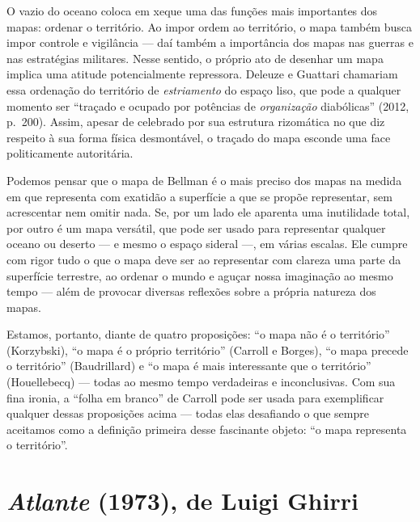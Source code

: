 O vazio do oceano coloca em xeque uma das funções mais importantes dos
mapas: ordenar o território. Ao impor ordem ao território, o mapa também
busca impor controle e vigilância --- daí também a importância dos mapas
nas guerras e nas estratégias militares. Nesse sentido, o próprio ato de
desenhar um mapa implica uma atitude potencialmente repressora. Deleuze
e Guattari chamariam essa ordenação do território de \emph{estriamento}
do espaço liso, que pode a qualquer momento ser ``traçado e ocupado por
potências de \emph{organização} diabólicas'' (2012, p.~200). Assim,
apesar de celebrado por sua estrutura rizomática no que diz respeito à
sua forma física desmontável, o traçado do mapa esconde uma face
politicamente autoritária.

Podemos pensar que o mapa de Bellman é o mais preciso dos mapas na
medida em que representa com exatidão a superfície a que se propõe
representar, sem acrescentar nem omitir nada. Se, por um lado ele
aparenta uma inutilidade total, por outro é um mapa versátil, que pode
ser usado para representar qualquer oceano ou deserto --- e mesmo o
espaço sideral ---, em várias escalas. Ele cumpre com rigor tudo o que o
mapa deve ser ao representar com clareza uma parte da superfície
terrestre, ao ordenar o mundo e aguçar nossa imaginação ao mesmo tempo
--- além de provocar diversas reflexões sobre a própria natureza dos
mapas.

Estamos, portanto, diante de quatro proposições: ``o mapa não é o
território'' (Korzybski), ``o mapa é o próprio território'' (Carroll e
Borges), ``o mapa precede o território'' (Baudrillard) e ``o mapa é mais
interessante que o território'' (Houellebecq) --- todas ao mesmo tempo
verdadeiras e inconclusivas. Com sua fina ironia, a ``folha em branco''
de Carroll pode ser usada para exemplificar qualquer dessas proposições
acima --- todas elas desafiando o que sempre aceitamos como a definição
primeira desse fascinante objeto: ``o mapa representa o território''.

\chapter{\emph{Atlante} (1973), de Luigi Ghirri}

